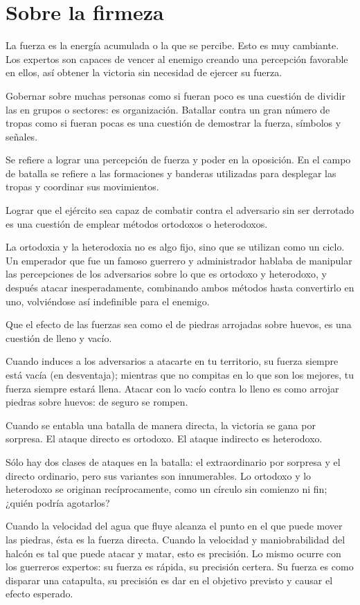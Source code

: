 \chapter{Sobre la firmeza}

La fuerza es la energía acumulada o la que se percibe. Esto es muy cambiante. Los expertos son capaces de vencer al enemigo creando una percepción favorable en ellos, así obtener la victoria sin necesidad de ejercer su fuerza.

Gobernar sobre muchas personas como si fueran poco es una cuestión de dividir las en grupos o sectores: es organización. Batallar contra un gran número de tropas como si fueran pocas es una cuestión de demostrar la fuerza, símbolos y señales.

Se refiere a lograr una percepción de fuerza y poder en la oposición. En el campo de batalla se refiere a las formaciones y banderas utilizadas para desplegar las tropas y coordinar sus movimientos.

Lograr que el ejército sea capaz de combatir contra el adversario sin ser derrotado es una cuestión de emplear métodos ortodoxos o heterodoxos.

La ortodoxia y la heterodoxia no es algo fijo, sino que se utilizan como un ciclo. Un emperador que fue un famoso guerrero y administrador hablaba de manipular las percepciones de los adversarios sobre lo que es ortodoxo y heterodoxo, y después atacar inesperadamente, combinando ambos métodos hasta convertirlo en uno, volviéndose así indefinible para el enemigo.

Que el efecto de las fuerzas sea como el de piedras arrojadas sobre huevos, es una cuestión de lleno y vacío.

Cuando induces a los adversarios a atacarte en tu territorio, su fuerza siempre está vacía (en desventaja); mientras que no compitas en lo que son los mejores, tu fuerza siempre estará llena. Atacar con lo vacío contra lo lleno es como arrojar piedras sobre huevos: de seguro se rompen.

Cuando se entabla una batalla de manera directa, la victoria se gana por sorpresa. El ataque directo es ortodoxo. El ataque indirecto es heterodoxo.

Sólo hay dos clases de ataques en la batalla: el extraordinario por sorpresa y el directo ordinario, pero sus variantes son innumerables. Lo ortodoxo y lo heterodoxo se originan recíprocamente, como un círculo sin comienzo ni fin; ¿quién podría agotarlos?

Cuando la velocidad del agua que fluye alcanza el punto en el que puede mover las piedras, ésta es la fuerza directa. Cuando la velocidad y maniobrabilidad del halcón es tal que puede atacar y matar, esto es precisión. Lo mismo ocurre con los guerreros expertos: su fuerza es rápida, su precisión certera. Su fuerza es como disparar una catapulta, su precisión es dar en el objetivo previsto y causar el efecto esperado.


